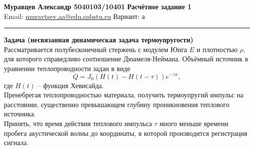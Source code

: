 \documentclass[a4paper, 11pt]{article}
\newenvironment{problem}[2][Problem]
    { \begin{mdframed}[backgroundcolor=gray!10] \textbf{#1 #2} \\}
    {  \end{mdframed}}
\begin{document}
\large\textbf{Муравцев Александр 5040103/10401} \hfill \textbf{Расчётное задание 1}   \\
Email: \href{mailto:muravtsev.aa@edu.spbstu.ru}{muravtsev.aa@edu.spbstu.ru} \hfill Вариант: а \\
\rule{7in}{2.8pt}

\begin{problem}[Задача]{(несвязанная динамическая задача термоупругости)}
 
 Рассматривается полубесконечный стержень с модулем Юнга $E$ и плотностью $\rho$, для которого справедливо соотношение Дюамеля-Неймана. Объёмный источник в уравнении теплопроводности задан в виде
 $$
 	Q=J_0(H(t)-H(t-\tau))e^{-\gamma x},
 $$
 где $H(t)$ -- функция Хевисайда.\\
 
 Пренебрегая теплопроводностью материала, получить термоупругий импульс на расстоянии, существенно превышающем глубину проникновения теплового источника.\\
 
 Принять, что время действия теплового импульса $\tau$ много меньше времени пробега акустической волны до координаты, в которой производится регистрация сигнала.

\end{problem}
\end{document}
